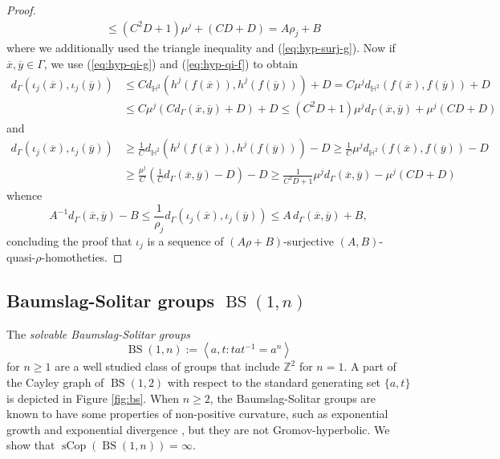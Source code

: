\documentclass{amsart}
\theoremstyle{definition}
\theoremstyle{remark}
\theoremstyle{remark}
\theoremstyle{definition}
\newcommand{\sCop}{\operatorname{sCop}}
\newcommand{\Z}{\mathbb{Z}} %
\renewcommand{\leq}{\leqslant}
\renewcommand{\geq}{\geqslant}
\begin{document}
\begin{proof}
\begin{align*}
    &\leq (C^2 D+1)\mu^j + (CD+D) =  A \rho_j + B
\end{align*}
where we additionally used the triangle inequality and (\ref{eq:hyp-surj-g}). Now if $\overline{x}, \overline{y} \in {\Gamma}$, we use (\ref{eq:hyp-qi-g}) and (\ref{eq:hyp-qi-f}) to obtain
\begin{align*}
    d_{\Gamma}(\iota_j(\overline{x}), \iota_j(\overline{y}))
    &\leq  C d_{\mathbb{H}^2}(h^j(f(\overline{x})), h^j(f(\overline{y}))) + D
    =    C \mu^j d_{\mathbb{H}^2}(f(\overline{x}), f(\overline{y})) + D \\
    & \leq C \mu^j (C d_{\Gamma}(\overline{x}, \overline{y}) + D) + D
     \leq (C^2D+1) \mu^j d_{\Gamma}(\overline{x}, \overline{y}) + \mu^j (CD + D)
\end{align*}
and
\begin{align*}
    d_{\Gamma}(\iota_j(\overline{x}), \iota_j(\overline{y}))
    &\geq \frac{1}{C} d_{\mathbb{H}^2}(h^j(f(\overline{x})), h^j(f(\overline{y}))) - D
     \geq \frac{1}{C} \mu^j d_{\mathbb{H}^2}(f(\overline{x}), f(\overline{y})) - D \\
    & \geq \frac{\mu^j}{C}  \left( \frac{1}{C} d_{\Gamma}(\overline{x},\overline{y}) - D \right) - D
		\geq   \frac{1}{C^2D + 1}\mu^j d_{\Gamma}(\overline{x},\overline{y}) -\mu^j (CD + D)
\end{align*}
whence
$$
A^{-1}d_{\Gamma}(\overline{x},\overline{y})- B \leq \frac{1}{\rho_j}d_{\Gamma}(\iota_j(\overline{x}), \iota_j(\overline{y})) \leq A \, d_{\Gamma}(\overline{x},\overline{y}) + B,
$$
concluding the proof that $\iota_j$ is a sequence of $(A\rho+B)$-surjective $(A,B)$-quasi-$\rho$-homotheties.
\end{proof}

\subsection{Baumslag-Solitar groups $\operatorname{BS}(1,n)$}\label{sec:bs}

The \emph{solvable Baumslag-Solitar groups}
$$
\operatorname{BS}(1,n) := \left\langle a,t \colon tat^{-1} = a^n\right\rangle
$$
for $n \geq 1$ are a well studied class of groups that include $\Z^2$ for $n=1$. A part of the Cayley graph of $\operatorname{BS}(1,2)$ with respect to the standard generating set $\{a,t\}$ is depicted in Figure \ref{fig:bs}. When $n \geq 2$, the Baumslag-Solitar groups are known to have some properties of non-positive curvature, such as exponential growth \cite{CEG94} and exponential divergence \cite{sisto2012arxiv}, but they are not Gromov-hyperbolic. We show that $\sCop(\operatorname{BS}(1,n)) = \infty$.
\end{document}
